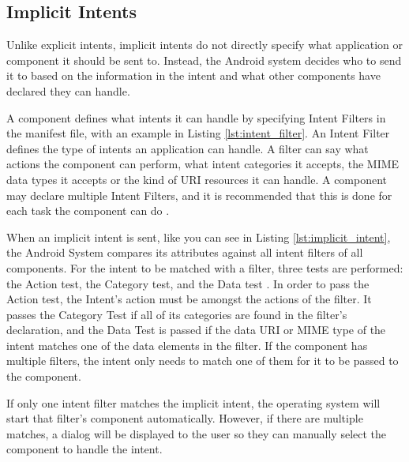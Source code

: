     \subsection{Implicit Intents}
        \label{sec:implicit_intents}
        
    Unlike explicit intents, implicit intents do not directly specify what application or component it should be sent to. Instead, the Android system decides who to send it to based on the information in the intent and what other components have declared they can handle.
    
    A component defines what intents it can handle by specifying Intent Filters in the manifest file, with an example in Listing \ref{lst:intent_filter}. An Intent Filter defines the type of intents an application can handle. A filter can say what actions the component can perform, what intent categories it accepts, the MIME data types it accepts or the kind of URI resources it can handle. A component may declare multiple Intent Filters, and it is recommended that this is done for each task the component can do \cite{intents_and_intent_filters}.
    
    
    
    When an implicit intent is sent, like you can see in Listing \ref{lst:implicit_intent}, the Android System compares its attributes against all intent filters of all components. For the intent to be matched with a filter, three tests are performed: the Action test, the Category test, and the Data test \cite{intents_and_intent_filters}. In order to pass the Action test, the Intent’s action must be amongst the actions of the filter. It passes the Category Test if all of its categories are found in the filter’s declaration, and the Data Test is passed if the data URI or MIME type of the intent matches one of the data elements in the filter. If the component has multiple filters, the intent only needs to match one of them for it to be passed to the component.
    
    
    
    If only one intent filter matches the implicit intent, the operating system will start that filter’s component automatically. However, if there are multiple matches, a dialog will be displayed to the user so they can manually select the component to handle the intent.
    
